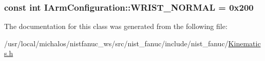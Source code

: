 \hypertarget{classIArmConfiguration_ae2cf37e0ff2e11888bcf97a5bf9ca824}{
\subsubsection[{W\-R\-I\-S\-T\-\_\-\-N\-O\-R\-M\-A\-L}]{\setlength{\rightskip}{0pt plus 5cm}const int I\-Arm\-Configuration\-::\-W\-R\-I\-S\-T\-\_\-\-N\-O\-R\-M\-A\-L = 0x200\hspace{0.3cm}{\ttfamily [static]}}}\label{classIArmConfiguration_ae2cf37e0ff2e11888bcf97a5bf9ca824}


The documentation for this class was generated from the following file\-:\begin{DoxyCompactItemize}
\item 
/usr/local/michalos/nistfanuc\-\_\-ws/src/nist\-\_\-fanuc/include/nist\-\_\-fanuc/\hyperlink{Kinematics_8h}{Kinematics.\-h}\end{DoxyCompactItemize}
